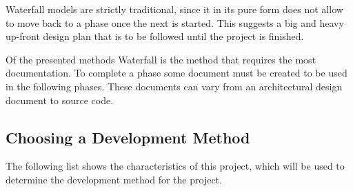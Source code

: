 Waterfall models are strictly traditional, since it in its pure form does not allow to move back to a phase once the next is started.
This suggests a big and heavy up-front design plan that is to be followed until the project is finished.

Of the presented methods Waterfall is the method that requires the most documentation.
To complete a phase some document must be created to be used in the following phases.
These documents can vary from an architectural design document to source code.

\subsection{Choosing a Development Method}
\label{subsec:choosingmethod}
The following list shows the characteristics of this project, which will be used to determine the development method for the project.
